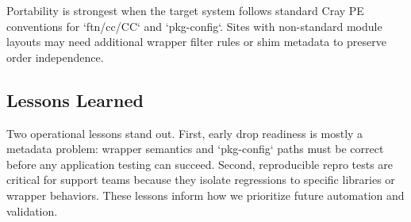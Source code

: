 Portability is strongest when the target system follows standard Cray PE
conventions for `ftn/cc/CC` and `pkg-config`. Sites with non-standard module
layouts may need additional wrapper filter rules or shim metadata to preserve
order independence.

\subsection{Lessons Learned}
\label{sec:lessons}
Two operational lessons stand out. First, early drop readiness is mostly a
metadata problem: wrapper semantics and `pkg-config` paths must be correct
before any application testing can succeed. Second, reproducible repro tests
are critical for support teams because they isolate regressions to specific
libraries or wrapper behaviors. These lessons inform how we prioritize future
automation and validation.
